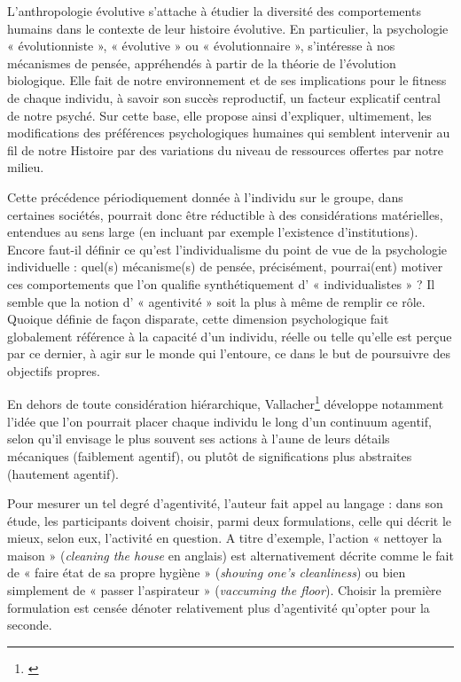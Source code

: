 \bigskip

L’anthropologie évolutive s’attache à étudier la diversité des comportements humains dans le contexte de leur histoire évolutive. En particulier, la psychologie « évolutionniste », « évolutive » ou « évolutionnaire », s’intéresse à nos mécanismes de pensée, appréhendés à partir de la théorie de l’évolution biologique. Elle fait de notre environnement et de ses implications pour le fitness de chaque individu, à savoir son succès reproductif, un facteur explicatif central de notre psyché. Sur cette base, elle propose ainsi d’expliquer, ultimement, les modifications des préférences psychologiques humaines qui semblent intervenir au fil de notre Histoire par des variations du niveau de ressources offertes par notre milieu.

Cette précédence périodiquement donnée à l’individu sur le groupe, dans certaines sociétés, pourrait donc être réductible à des considérations matérielles, entendues au sens large (en incluant par exemple l’existence d’institutions). Encore faut-il définir ce qu’est l’individualisme du point de vue de la psychologie individuelle : quel(s) mécanisme(s) de pensée, précisément, pourrai(ent) motiver ces comportements que l’on qualifie synthétiquement d’ « individualistes » ?  Il semble que la notion d’ « agentivité » soit la plus à même de remplir ce rôle. Quoique définie de façon disparate, cette dimension psychologique fait globalement référence à la capacité d’un individu, réelle ou telle qu’elle est perçue par ce dernier, à agir sur le monde qui l’entoure, ce dans le but de poursuivre des objectifs propres. 

En dehors de toute considération hiérarchique, Vallacher\footnote{\cite{vallacher_levels_1989}} développe notamment l’idée que l’on pourrait placer chaque individu le long d’un continuum agentif, selon qu’il envisage le plus souvent ses actions à l’aune de leurs détails mécaniques (faiblement agentif), ou plutôt de significations plus abstraites (hautement agentif).

Pour mesurer un tel degré d’agentivité, l’auteur fait appel au langage : dans son étude, les participants doivent choisir, parmi deux formulations, celle qui décrit le mieux, selon eux, l’activité en question. A titre d’exemple, l’action « nettoyer la maison » (\textit{cleaning the house} en anglais) est alternativement décrite comme le fait de « faire état de sa propre hygiène » (\textit{showing one’s cleanliness}) ou bien simplement de « passer l’aspirateur » (\textit{vaccuming the floor}). Choisir la première formulation est censée dénoter relativement plus d’agentivité qu’opter pour la seconde.

